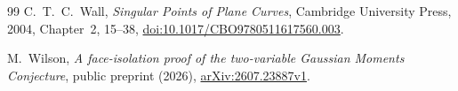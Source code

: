 \documentclass[11pt]{article}
\theoremstyle{definition}\newtheorem{definition}[theorem]{Definition}
\theoremstyle{remark}\newtheorem{remark}[theorem]{Remark}
\begin{document}
\begin{thebibliography}{99}
C.~T.~C.~Wall, \emph{Singular Points of Plane Curves}, Cambridge
University Press, 2004, Chapter~2, 15--38,
\href{https://doi.org/10.1017/CBO9780511617560.003}{doi:10.1017/CBO9780511617560.003}.

M.~Wilson, \emph{A face-isolation proof of the two-variable Gaussian
Moments Conjecture}, public preprint (2026),
\href{https://arxiv.org/abs/2607.23887v1}{arXiv:2607.23887v1}.
\end{thebibliography}
\end{document}

